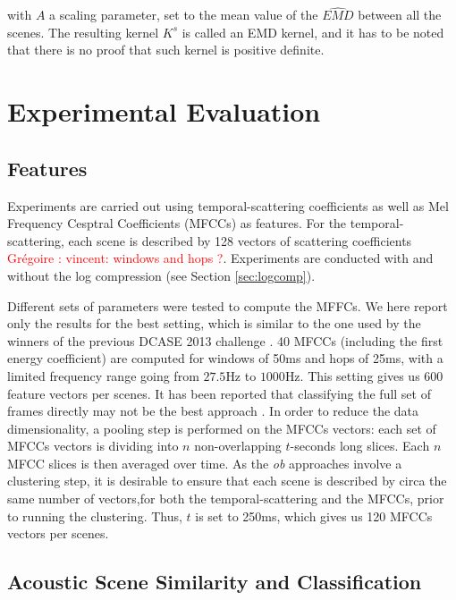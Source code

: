 \documentclass[journal]{IEEEtran}
\newcommand{\gl}[1]{\textcolor{red}{Gr\'egoire : #1}}
\begin{document}
with $A$ a scaling parameter, set to the mean value of the $\widehat{EMD}$ between all the scenes. The resulting kernel $K^s$ is called an EMD kernel, and it has to be noted that there is no proof that such kernel is positive definite. \\

\section{Experimental Evaluation}
\label{sec:ExpEval}

\subsection{Features}

Experiments are carried out using temporal-scattering coefficients as well as Mel Frequency Cesptral Coefficients (MFCCs) as features. For the temporal-scattering, each scene is described by 128 vectors of scattering coefficients \gl{vincent: windows and hops ?}. Experiments are conducted with and without the log compression (see Section \ref{sec:logcomp}).

Different sets of parameters were tested to compute the MFFCs. We here report only the results for the best setting, which is similar to the one used by the winners of the previous DCASE 2013 challenge \cite{roma2013}. 40 MFCCs (including the first energy coefficient) are computed for windows of 50ms and hops of 25ms, with a limited frequency range going from $27.5$Hz to $1000$Hz. This setting gives us 600 feature vectors per scenes. It has been reported that classifying the full set of frames directly may not be the best approach \cite{rakotomamonjy2015histogram}. In order to reduce the data dimensionality, a pooling step is performed on the MFCCs vectors: each set of MFCCs vectors is dividing into $n$ non-overlapping $t$-seconds long slices. Each $n$ MFCC slices is then averaged over time. As the \emph{ob} approaches involve a clustering step, it is desirable to ensure that each scene is described by circa the same number of vectors,for both the temporal-scattering and the MFCCs, prior to running the clustering. Thus, $t$ is set to 250ms, which gives us 120 MFCCs vectors per scenes. 


\subsection{Acoustic Scene Similarity and Classification}
\end{document}
